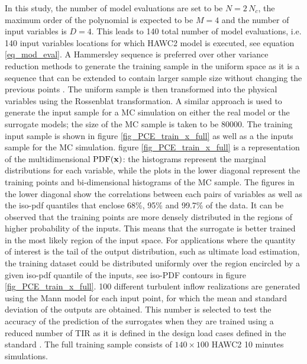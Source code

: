 \documentclass[preprint,12pt]{elsarticle}
\begin{document}
In this study, the number of model evaluations are set to be $N=2\,N_c$, the maximum order of the polynomial is expected to be $M=4$ and the number of input variables is $D=4$. This leads to 140 total number of model evaluations, i.e. 140 input variables locations for which HAWC2 model is executed, see equation \ref{eq_mod_eval}. %
A Hammersley sequence \cite{hammersley1960monte} is preferred over other variance reduction methods to generate the training sample in the uniform space as it is a sequence that can be extended to contain larger sample size without changing the previous points \cite{feinberg2015chaospy,hosder2007efficient}. The uniform sample is then transformed into the physical variables using the Rossenblat transformation. A similar approach is used to generate the input sample for a MC simulation on either the real model or the surrogate models; the size of the MC sample is taken to be 80000. The training input sample is shown in figure \ref{fig_PCE_train_x_full} as well as a the inputs sample for the MC simulation. figure \ref{fig_PCE_train_x_full} is a representation of the multidimensional $\mathrm{PDF}(\mathbf{x})$: the histograms represent the marginal distributions for each variable, while the plots in the lower diagonal represent the training points and bi-dimensional histograms of the MC sample. The figures in the lower diagonal show the correlations between each pairs of variables as well as the iso-pdf quantiles that enclose 68\%, 95\% and 99.7\% of the data. It can be observed that the training points are more densely distributed in the regions of higher probability of the inputs. This means that the surrogate is better trained in the most likely region of the input space. For applications where the quantity of interest is the tail of the output distribution, such as ultimate load estimation, the training dataset could be distributed uniformly over the region encircled by a given iso-pdf quantile of the inputs, see iso-PDF contours in figure \ref{fig_PCE_train_x_full}.  100 different turbulent inflow realizations are generated using the Mann model for each input point, for which the mean and standard deviation of the outputs are obtained. This number is selected to test the accuracy of the prediction of the surrogates when they are trained using a reduced number of TIR as it is defined in the design load cases defined in the standard \cite{international2005iec}. The full training sample consists of $140 \times 100$ HAWC2 10 minutes simulations.
\end{document}

